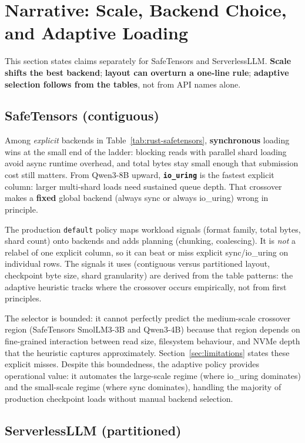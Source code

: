 \section{Narrative: Scale, Backend Choice, and Adaptive Loading}
\label{sec:narrative_scope}

This section states claims separately for SafeTensors and ServerlessLLM. \textbf{Scale shifts the best backend}; \textbf{layout can overturn a one-line rule}; \textbf{adaptive selection follows from the tables}, not from API names alone.

\subsection{SafeTensors (contiguous)}

Among \emph{explicit} backends in Table~\ref{tab:rust-safetensors}, \textbf{synchronous} loading wins at the small end of the ladder: blocking reads with parallel shard loading avoid async runtime overhead, and total bytes stay small enough that submission cost still matters. From Qwen3-8B upward, \textbf{\texttt{io\_uring}} is the fastest explicit column: larger multi-shard loads need sustained queue depth. That crossover makes a \textbf{fixed} global backend (always sync or always io\_uring) wrong in principle.

The production \texttt{default} policy maps workload signals (format family, total bytes, shard count) onto backends and adds planning (chunking, coalescing). It is \emph{not} a relabel of one explicit column, so it can beat or miss explicit sync/io\_uring on individual rows. The signals it uses (contiguous versus partitioned layout, checkpoint byte size, shard granularity) are derived from the table patterns: the adaptive heuristic tracks where the crossover occurs empirically, not from first principles.

The selector is bounded: it cannot perfectly predict the medium-scale crossover region (SafeTensors SmolLM3-3B and Qwen3-4B) because that region depends on fine-grained interaction between read size, filesystem behaviour, and NVMe depth that the heuristic captures approximately. Section~\ref{sec:limitations} states these explicit misses. Despite this boundedness, the adaptive policy provides operational value: it automates the large-scale regime (where io\_uring dominates) and the small-scale regime (where sync dominates), handling the majority of production checkpoint loads without manual backend selection.

\subsection{ServerlessLLM (partitioned)}


